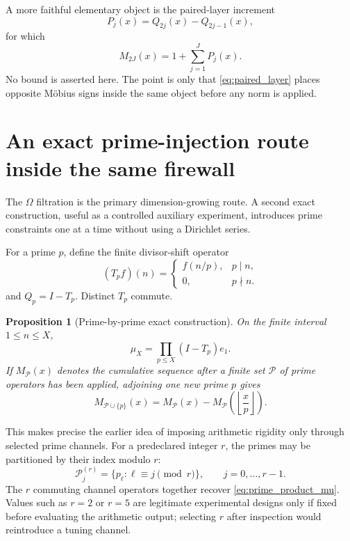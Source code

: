 \documentclass[11pt]{amsart}
\numberwithin{equation}{section}
\theoremstyle{plain}
\newtheorem{proposition}[theorem]{Proposition}
\theoremstyle{definition}
\theoremstyle{remark}
\begin{document}
A more faithful elementary object is the paired-layer increment
\begin{equation}
P_j(x)=Q_{2j}(x)-Q_{2j-1}(x),
\label{eq:paired_layer}
\end{equation}
for which
\begin{equation}
M_{2J}(x)=1+\sum_{j=1}^J P_j(x).
\label{eq:paired_reconstruction}
\end{equation}
No bound is asserted here.  The point is only that \eqref{eq:paired_layer} places opposite
M\"obius signs inside the same object before any norm is applied.


\section{An exact prime-injection route inside the same firewall}
\label{sec:prime_injection_route}

The $\Omega$ filtration is the primary dimension-growing route.  A second exact construction,
useful as a controlled auxiliary experiment, introduces prime constraints one at a time without
using a Dirichlet series.

For a prime $p$, define the finite divisor-shift operator
\begin{equation}
(T_pf)(n)
=
\begin{cases}
f(n/p),&p\mid n,\\
0,&p\nmid n.
\end{cases}
\label{eq:Tp}
\end{equation}
and $Q_p=I-T_p$.  Distinct $T_p$ commute.

\begin{proposition}[Prime-by-prime exact construction]
\label{prop:prime_by_prime_mu}
On the finite interval $1\le n\le X$,
\begin{equation}
\mu_X
=
\prod_{p\le X}(I-T_p)e_1.
\label{eq:prime_product_mu}
\end{equation}
If $M_{\mathcal P}(x)$ denotes the cumulative sequence after a finite set
$\mathcal P$ of prime operators has been applied, adjoining one new prime $p$ gives
\begin{equation}
M_{\mathcal P\cup\{p\}}(x)
=
M_{\mathcal P}(x)
-
M_{\mathcal P}
\left(\left\lfloor\frac xp\right\rfloor\right).
\label{eq:prime_floor_update}
\end{equation}
\end{proposition}

This makes precise the earlier idea of imposing arithmetic rigidity only through selected prime
channels.  For a predeclared integer $r$, the primes may be partitioned by their index modulo
$r$:
\[
\mathcal P_j^{(r)}=
\{p_\ell:\ell\equiv j\pmod r\},
\qquad
j=0,\ldots,r-1.
\]
The $r$ commuting channel operators together recover
\eqref{eq:prime_product_mu}.  Values such as $r=2$ or $r=5$ are legitimate experimental
designs only if fixed before evaluating the arithmetic output; selecting $r$ after inspection
would reintroduce a tuning channel.
\end{document}
